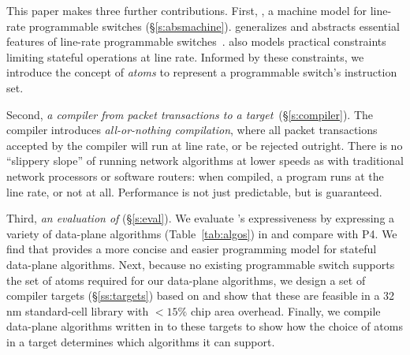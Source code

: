 This paper makes three further contributions. First, {\em
  \absmachine}, a machine model for line-rate programmable switches
(\S\ref{s:absmachine}). \absmachine generalizes and abstracts
essential features of line-rate programmable switches~\cite{rmt,
  xpliant, flexpipe}. \absmachine also models practical constraints
limiting stateful operations at line rate.  Informed by these
constraints, we introduce the concept of {\em atoms} to represent a
programmable switch's instruction set.

Second, {\em a compiler from \pktlanguage packet transactions to a
  \absmachine target}~(\S\ref{s:compiler}). The \pktlanguage compiler
introduces \textit{all-or-nothing compilation}, where all packet
transactions accepted by the compiler will run at line rate, or be
rejected outright. There is no ``slippery slope'' of running network
algorithms at lower speeds as with traditional network processors or
software routers: when compiled, a \pktlanguage program runs at the
line rate, or not at all. Performance is not just predictable, but
is guaranteed.

Third, {\em an evaluation of \pktlanguage} (\S\ref{s:eval}). We evaluate
\pktlanguage's expressiveness by expressing a variety of data-plane
algorithms (Table~\ref{tab:algos}) in \pktlanguage and compare with
P4. We find that \pktlanguage provides a more concise and easier
programming model for stateful data-plane algorithms.  Next, because
no existing programmable switch supports the set of atoms required for
our data-plane algorithms, we design a set of compiler targets
(\S\ref{ss:targets}) based on \absmachine and show that these are
feasible in a 32 nm standard-cell library with $< 15\%$ chip area
overhead.  Finally, we compile data-plane algorithms written in
\pktlanguage to these targets to show how the choice of atoms in a
target determines which algorithms it can support.
